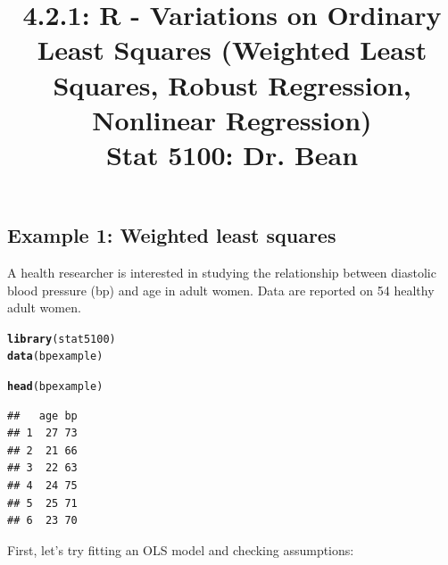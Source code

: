 \documentclass{article}\usepackage[]{graphicx}\usepackage[]{color}
\makeatletter
\newcommand{\hlstd}[1]{\textcolor[rgb]{0.345,0.345,0.345}{#1}}%
\newcommand{\hlkwd}[1]{\textcolor[rgb]{0.737,0.353,0.396}{\textbf{#1}}}%
\newenvironment{kframe}{%
 \def\at@end@of@kframe{}%
 \ifinner\ifhmode%
  \def\at@end@of@kframe{\end{minipage}}%
  \begin{minipage}{\columnwidth}%
 \fi\fi%
 \def\FrameCommand##1{\hskip\@totalleftmargin \hskip-\fboxsep
 \colorbox{shadecolor}{##1}\hskip-\fboxsep
     \hskip-\linewidth \hskip-\@totalleftmargin \hskip\columnwidth}%
 \MakeFramed {\advance\hsize-\width
   \@totalleftmargin\z@ \linewidth\hsize
   \@setminipage}}%
 {\par\unskip\endMakeFramed%
 \at@end@of@kframe}
\newenvironment{knitrout}{}{} %
\makeatother
\begin{document}
\title{%
  4.2.1: R - Variations on Ordinary Least Squares (Weighted Least Squares,
  Robust Regression, Nonlinear Regression) \\
  \smallskip
  \large Stat 5100: Dr. Bean
}
\date{}

\maketitle

\subsection*{Example 1: Weighted least squares}
A health researcher is interested in studying the relationship between diastolic blood pressure (bp) and age in adult women.  Data are reported on 54 healthy adult women.

\begin{knitrout}
\color{fgcolor}\begin{kframe}
\begin{alltt}
\hlkwd{library}\hlstd{(stat5100)}
\hlkwd{data}\hlstd{(bpexample)}

\hlkwd{head}\hlstd{(bpexample)}
\end{alltt}
\begin{verbatim}
##   age bp
## 1  27 73
## 2  21 66
## 3  22 63
## 4  24 75
## 5  25 71
## 6  23 70
\end{verbatim}
\end{kframe}
\end{knitrout}

First, let's try fitting an OLS model and checking assumptions:
\end{document}
